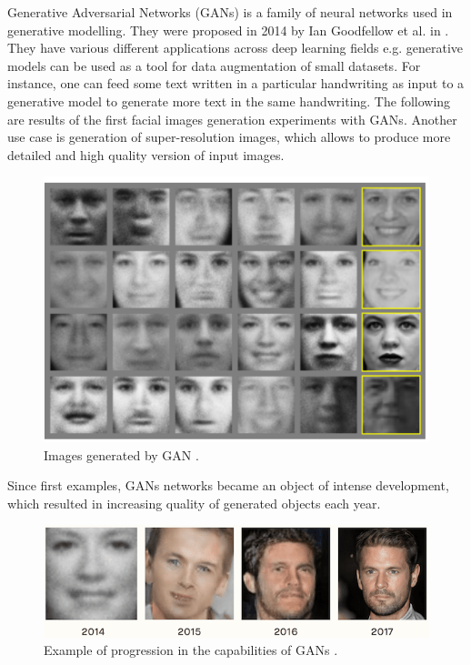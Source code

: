 \documentclass[12pt,a4paper,openany]{book}
\begin{document}
\noindent Generative Adversarial Networks (GANs) is a family of neural networks used in generative modelling. They were proposed in 2014 by Ian Goodfellow et al. in \cite{gan}.\\
\noindent They have various different applications across deep learning fields e.g. generative models can be used as a tool for data augmentation of small datasets. For instance, one can feed some text written in a particular handwriting as input to a generative model to generate more text in the same handwriting. The following are results of the first facial images generation experiments with GANs. Another use case is generation of super-resolution images, which allows to produce more detailed and high quality version of input images. 
 \begin{figure}[ht!]
     \centering
     \includegraphics[scale=0.4]{figs/faces.png}
     \caption{Images generated by GAN \cite{gan}.}
 \end{figure}
 \newpage
\noindent Since first examples, GANs networks became an object of intense development, which resulted in increasing quality of generated objects each year.
 \begin{figure}[ht!]
     \centering
     \includegraphics[scale=0.5]{figs/gan_progression.png}
     \caption{Example of progression in the capabilities of GANs \cite{ganprogress}. }
 \end{figure}
 \newline
\end{document}
